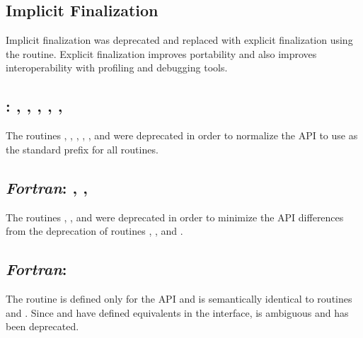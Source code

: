 \subsection{Implicit Finalization}
Implicit finalization was deprecated and replaced with explicit finalization using the
 routine.  Explicit finalization improves portability and
also improves interoperability with profiling and debugging tools.

\subsection{\CorCpp: , , ,
    , , }
The \CorCpp routines , , ,
, , and  were deprecated in order
to normalize the \openshmem \ac{API} to use \shmemprefixLC{} as the standard
prefix for all routines.

\subsection{\textit{Fortran}: , , } %
The \Fortran routines , , and 
were deprecated in order to minimize the API differences from the deprecation
of \CorCpp routines , , and .

\subsection{\textit{Fortran}: } %
The \Fortran routine  is defined only for the \Fortran
\ac{API} and is semantically identical to \Fortran routines
 and .  Since  and
 have defined equivalents in the \CorCpp interface,
 is ambiguous and has been deprecated.


